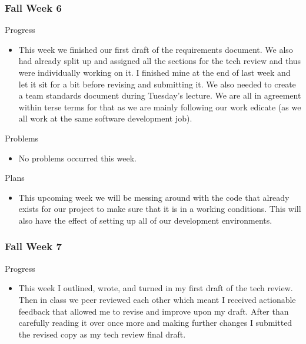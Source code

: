     \subsubsection{Fall Week 6}
    
        \noindent
        Progress
        \begin{itemize}
            \item This week we finished our first draft of the requirements document.  We also had already split up and assigned all the sections for the tech review and thus were individually working on it.  I finished mine at the end of last week and let it sit for a bit before revising and submitting it.  We also needed to create a team standards document during Tuesday’s lecture.  We are all in agreement within terse terms for that as we are mainly following our work edicate (as we all work at the same software development job).
        \end{itemize}
        
        \noindent
        Problems
        \begin{itemize}
            \item No problems occurred this week.
        \end{itemize}
        
        \noindent
        Plans
        \begin{itemize}
            \item This upcoming week we will be messing around with the code that already exists for our project to make sure that it is in a working conditions.  This will also have the effect of setting up all of our development environments.
        \end{itemize}
        
    \subsubsection{Fall Week 7}
    
        \noindent
        Progress
        \begin{itemize}
            \item This week I outlined, wrote, and turned in my first draft of the tech review.  Then in class we peer reviewed each other which meant I received actionable feedback that allowed me to revise and improve upon my draft.  After than carefully reading it over once more and making further changes I submitted the revised copy as my tech review final draft.
        \end{itemize}
        
